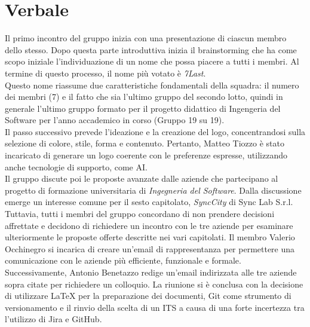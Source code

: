 \documentclass[italian,12pt]{article} %
\begin{document}
\newpage

\section{Verbale}
\begin{flushleft}
Il primo incontro del gruppo inizia con una presentazione di ciascun membro dello stesso.
Dopo questa parte introduttiva inizia il brainstorming che ha come scopo iniziale l’individuazione di un nome che possa piacere a tutti i membri.
Al termine di questo processo, il nome più votato è \textit{7Last}. \\
Questo nome riassume due caratteristiche fondamentali della squadra: il numero dei membri (7) e il fatto che sia l'ultimo gruppo del secondo lotto, quindi in generale l'ultimo gruppo formato per il progetto didattico di Ingengeria del Software per l'anno accademico in corso (Gruppo 19 su 19). \\
Il passo successivo prevede l'ideazione e la creazione del logo, concentrandosi sulla selezione di colore, stile, forma e contenuto.
Pertanto, Matteo Tiozzo è stato incaricato di generare un logo coerente con le preferenze espresse, utilizzando anche tecnologie di supporto, come AI. \\
Il gruppo discute poi le proposte avanzate dalle aziende che partecipano al progetto di formazione universitaria di \textit{Ingegneria del Software}. Dalla discussione emerge un interesse comune per il sesto capitolato, \textit{SyncCity} di Sync Lab S.r.l. Tuttavia, tutti i membri del gruppo concordano di non prendere decisioni affrettate e decidono di richiedere un incontro con le tre aziende per esaminare ulteriormente le proposte offerte descritte nei vari capitolati. Il membro Valerio Occhinegro si incarica di creare un'email di rappresentanza per permettere una comunicazione con le aziende più efficiente, funzionale e formale. Successivamente, Antonio Benetazzo redige un'email indirizzata alle tre aziende sopra citate per richiedere un colloquio.
La riunione si è conclusa con la decisione di utilizzare LaTeX per la preparazione dei documenti, Git come strumento di versionamento e il rinvio della scelta di un ITS a causa di una forte incertezza tra l'utilizzo di Jira e GitHub.

\end{flushleft}
\end{document}
